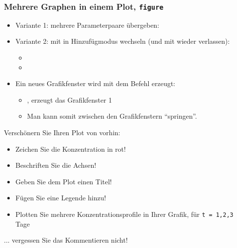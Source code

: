       \begin{frame}
          \frametitle{Mehrere Graphen in einem Plot, \texttt{figure}}
          \begin{itemize}
              \item Variante 1: mehrere Parameterpaare übergeben: 
              \item Variante 2: mit  in Hinzufügmodus wechseln (und mit  wieder verlassen):
              \begin{itemize}
                  \item {}
                  \item {}
              \end{itemize}
              \item Ein neues Grafikfenster wird mit dem Befehl  erzeugt:
              \begin{itemize}
                  \item {}, erzeugt das Grafikfenster 1
                  \item Man kann somit zwischen den Grafikfenstern ``springen''.
              \end{itemize}
          \end{itemize}
      \end{frame}


      \secMexercise
      \begin{frame}
          \frameMexercise
          \begin{exercise}
              \sloppy
              Verschönern Sie Ihren Plot von vorhin:
              \begin{itemize}
                  \item Zeichen Sie die Konzentration in rot!
                  \item Beschriften Sie die Achsen!
                  \item Geben Sie dem Plot einen Titel!
                  \item Fügen Sie eine Legende hinzu!
                  \item Plotten Sie mehrere Konzentrationsprofile in Ihrer Grafik, für \texttt{t = 1,2,3} Tage
              \end{itemize}
         	  ... vergessen Sie das \alert{Kommentieren} nicht!
          \end{exercise}
      \end{frame}

